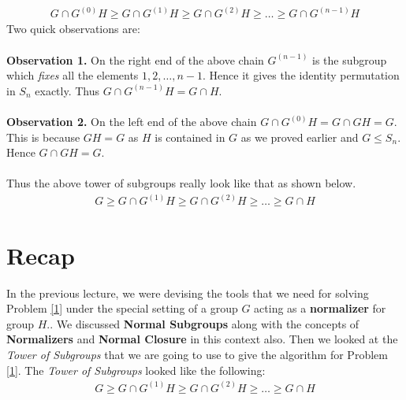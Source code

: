 \begin{eqnarray*}
	G\cap G^{(0)}H \geq G\cap G^{(1)}H \geq G\cap G^{(2)}H \geq \ldots \geq G\cap G^{(n-1)}H
\end{eqnarray*}
Two quick observations are:\\\\{\bf Observation 1.} On the right end of the above chain $G^{(n-1)}$ is the subgroup which \emph{fixes} all the elements $1,2,\ldots,n-1$. Hence it gives the identity permutation in $S_n$ exactly. Thus $G\cap G^{(n-1)}H  = G\cap H$.\\\\{\bf Observation 2.} On the left end of the above chain $G\cap G^{(0)}H = G\cap GH = G$. This is because $GH = G$ as $H$ is contained in $G$ as we proved earlier and $G\leq S_n$. Hence $G\cap GH = G$.\\\\Thus the above tower of subgroups really look like that as shown below.
\begin{eqnarray*}
	G\geq G\cap G^{(1)}H \geq G\cap G^{(2)}H \geq \ldots \geq G\cap H
\end{eqnarray*}




\section{Recap}
In the previous lecture, we were devising the tools that we need for solving Problem \ref{1} under the special setting of a group $G$ acting as a {\bf normalizer} for group $H$.. We discussed {\bf Normal Subgroups} along with the concepts of {\bf Normalizers} and {\bf Normal Closure} in this context also. Then we looked at the \emph{Tower of Subgroups} that we are going to use to give the algorithm for Problem \ref{1}. The \emph{Tower of Subgroups} looked like the following:
\begin{eqnarray*}
	G\geq G\cap G^{(1)}H \geq G\cap G^{(2)}H \geq \ldots \geq G\cap H
\end{eqnarray*}

